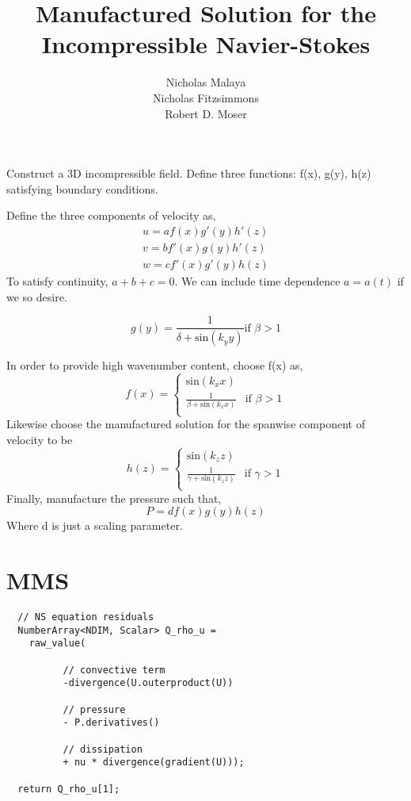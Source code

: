 \documentclass{article}
\title{\bf{Manufactured Solution for the Incompressible Navier-Stokes}}
\author{Nicholas Malaya \\ Nicholas Fitzsimmons \\ Robert D. Moser} \date{}
\begin{document}
\maketitle

Construct a 3D incompressible field. Define three functions: f(x), g(y),
h(z) satisfying boundary conditions. 

Define the three components of velocity as,
\begin{align}
u = a f(x)  g'(y)  h'(z) \\
v = b f'(x) g(y)   h'(z) \\
w = c f'(x) g'(y)  h(z) 
\end{align}
To satisfy continuity, $a+b+c=0$. We can include time dependence
$a=a(t)$ if we so desire.

\begin{equation}
 g(y) = \frac{1}{\delta + \text{sin}(k_y y)} \mbox{if } \beta > 1
\end{equation}

In order to provide high wavenumber content, choose f(x) as,
\begin{equation}
 f(x) =
  \begin{cases}
   \text{sin}(k_x x)  \\
   \frac{1}{\beta + \text{sin}(k_x x)} & \mbox{if } \beta > 1 \\
  \end{cases}
\end{equation}
Likewise choose the manufactured solution for the spanwise component of
velocity to be
\begin{equation}
 h(z) =
  \begin{cases}
   \text{sin}(k_z z)  \\
   \frac{1}{\gamma + \text{sin}(k_z z)} & \mbox{if } \gamma > 1 \\
  \end{cases}
\end{equation}
Finally, manufacture the pressure such that, 
\begin{equation}
 P = d f(x) g(y) h(z)
\end{equation}
Where d is just a scaling parameter. 
\newpage
\section{MMS}
\begin{verbatim}
  // NS equation residuals
  NumberArray<NDIM, Scalar> Q_rho_u = 
    raw_value(

	      // convective term
	      -divergence(U.outerproduct(U))

	      // pressure
	      - P.derivatives()

	      // dissipation
	      + nu * divergence(gradient(U)));

  return Q_rho_u[1];
\end{verbatim}
\end{document}
